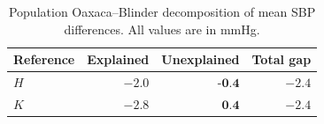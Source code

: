 \begin{table}[H]
\caption{Population Oaxaca–Blinder decomposition of mean SBP differences. All values are in mmHg.}
\label{tab:ob_decomp}
\begin{center}
\small
\begin{tabular}{lrrr}
\toprule
Reference & Explained & Unexplained & Total gap \\
\midrule
$H$ & $-2.0$ & $\textbf{-0.4}$ & $-2.4$ \\
$K$ & $-2.8$ & $\textbf{0.4}$  & $-2.4$ \\
\bottomrule
\end{tabular}
\end{center}
\vskip -0.1in
\end{table}





